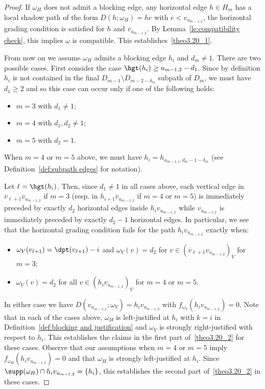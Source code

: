 \begin{proof}
 If $\omega_H$ does not admit a blocking edge, any horizontal edge $h\in H_m$ has a local shadow path of the form $D(h;\omega_H)=he$ with $e<v_{u_{m-1,2}}$, \ie the horizontal grading condition is satisfied for $h$ and $v_{u_{m-1,2}}$. By Lemma~\ref{le:compatibility check}, this implies $\omega$ is compatible. 
 This establishes~\ref{theo3.20_1}. 
 
 From now on we assume $\omega_H$ admits a blocking edge $h_i$ and $d_m\ne1$. 
 There are two possible cases.
 First consider the case $\hgt(h_i)\ge u_{m-1,2}-d_1$.
 Since by definition $h_i$ is not contained in the final $D_{m-1}\setminus D_{m-2-\delta_m}$ subpath of $D_m$, we must have $d_1\ge2$ and so this case can occur only if one of the following holds:
 \begin{itemize}
 \item $m=3$ with $d_1\ne1$;
 \item $m=4$ with $d_1,d_2\ne1$;
 \item $m=5$ with $d_2=1$.
 \end{itemize}
 When $m=4$ or $m=5$ above, we must have $h_i=h_{u_{m-1,1},d_m-1-\delta_m}$ (see Definition~\ref{def:subpath edges} for notation).

 Let $\ell=\hgt(h_i)$.
 Then, since $d_1\ne1$ in all cases above, each vertical edge in $\overline{v}_{\ell+1}\overline{v}_{u_{m-1,2}}$ if $m=3$ (resp. in $h_{i+1}\overline{v}_{u_{m-1,2}}$ if $m=4$ or $m=5$) is immediately preceded by exactly $d_2$ horizontal edges inside $h_iv_{u_{m-1,2}}$ while $v_{u_{m-1,2}}$ is immediately preceded by exactly $d_2-1$ horizontal edges.
 In particular, we see that the horizontal grading condition fails for the path $h_iv_{u_{m-1,2}}$ exactly when:
 \begin{itemize}
 \item $\omega_V(v_{\ell+1})=\dpt(v_{\ell+1})-i$ and $\omega_V(v)=d_2$ for $v\in(\overline{v}_{\ell+1}v_{u_{m-1,2}})_V$ for $m=3$;
 \item $\omega_V(v)=d_2$ for all $v\in(h_iv_{u_{m-1,2}})_V$ for $m=4$ or $m=5$.
 \end{itemize}
 In either case we have $D(v_{u_{m-1,2}};\omega_V)=h_iv_{u_{m-1,2}}$ with $f_{\omega_V}(h_iv_{u_{m-1,2}})=0$.
 Note that in each of the cases above, $\omega_H$ is left-justified at $h_i$ with $k=i$ in Definition~\ref{def:blocking and justification} and $\omega_V$ is strongly right-justified with respect to $h_i$.
 This establishes the claims in the first part of~\ref{theo3.20_2} for these cases.
 Observe that our assumptions when $m=4$ or $m=5$ imply $f_{\omega_H}(h_iv_{u_{m-1,2}})=0$ and that $\omega_H$ is strongly left-justified at $h_i$.
 Since $\supp(\omega_H)\cap h_iv_{u_{m-1,2}}=\{h_i\}$, this establishes the second part of~\ref{theo3.20_2} in these cases.
 

\end{proof}

